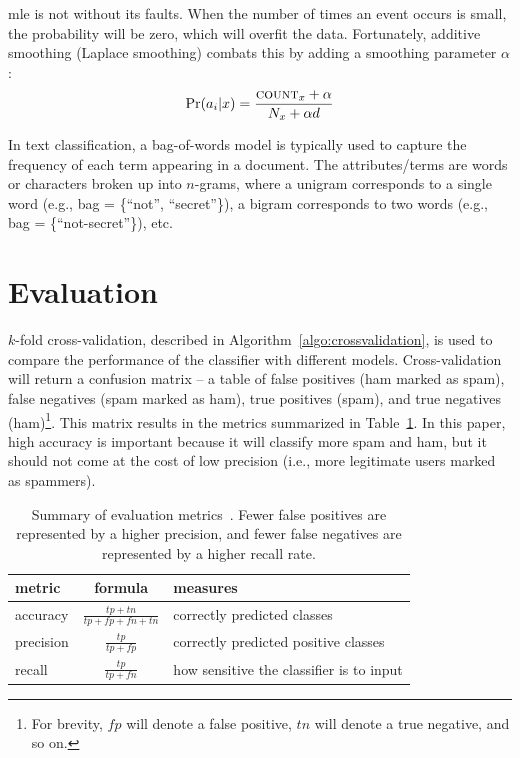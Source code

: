 \documentclass[draft,10pt]{article}
\begin{document}
{\sc mle} is not without its faults. When the number of times an event occurs
is small, the probability will be zero, which will overfit the data.
Fortunately, additive smoothing (Laplace smoothing) combats this by adding a
smoothing parameter $\alpha$:
\[ \Pr(a_i|x) = \frac{{\textsc{count}}_x + \alpha}{N_x + \alpha d} \]

In text classification, a bag-of-words model is typically used to capture the
frequency of each term appearing in a document. The attributes/terms are words
or characters broken up into $n$-grams, where a unigram corresponds to a
single word (e.g., bag = \{``not'', ``secret''\}), a bigram corresponds to two
words (e.g., bag = \{``not-secret''\}), etc.

\section{Evaluation}
$k$-fold cross-validation, described in Algorithm~\ref{algo:crossvalidation},
is used to compare the performance of the classifier with different models.
Cross-validation will return a confusion matrix -- a table of false positives
(ham marked as spam), false negatives (spam marked as ham), true positives
(spam), and true negatives (ham)\footnote{For brevity, $fp$ will denote a
  false positive, $tn$ will denote a true negative, and so on.}. This
matrix results in the metrics summarized in Table~\ref{table:metrics}. In
this paper, high accuracy is important because it will classify more spam and
ham, but it should not come at the cost of low precision (i.e., more
legitimate users marked as spammers).

\begin{table}[t]
  \centering
  \caption{Summary of evaluation metrics~\cite{eval}. Fewer false positives
    are represented by a higher precision, and fewer false negatives are
    represented by a higher recall rate.}
  \label{table:metrics}
  \begin{tabular}{lcl}
    \toprule
    metric & formula & measures \\ \midrule
  accuracy & $\frac{tp + tn}{tp + fp + fn + tn}$ & correctly predicted classes \\
  precision & $\frac{tp}{tp + fp}$ & correctly predicted positive classes\\
  recall & $\frac{tp}{tp + fn}$ & how sensitive the classifier is to input \\\bottomrule
  \end{tabular}
\end{table}
\end{document}
